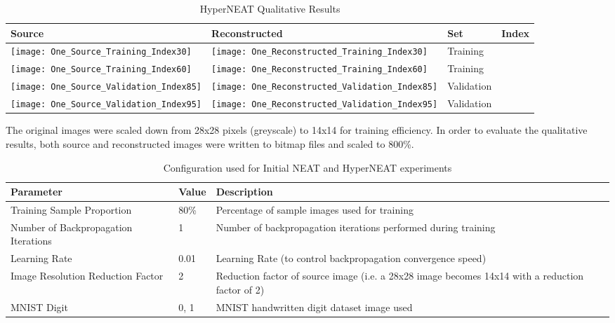 \documentclass{acm_proc_article-sp}
\begin{document}
\begin{table}[h]
	\caption{HyperNEAT Qualitative Results}
	\small
	\centering
	\begin{tabular}{>{\centering}m{1.7cm} >{\centering}m{2.1cm} >{\centering}m{1.7cm} >{\centering\arraybackslash}m{1.5cm}}
		\hline\hline
		\textbf{Source} & \textbf{Reconstructed} & \textbf{Set} & \textbf{Index} \\
		\hline
		\texttt{[image: One\_Source\_Training\_Index30]} & \texttt{[image: One\_Reconstructed\_Training\_Index30]} & Training & 30 \\
		\texttt{[image: One\_Source\_Training\_Index60]} & \texttt{[image: One\_Reconstructed\_Training\_Index60]} & Training & 60 \\
		\texttt{[image: One\_Source\_Validation\_Index85]} & \texttt{[image: One\_Reconstructed\_Validation\_Index85]} & Validation & 85 \\
		\texttt{[image: One\_Source\_Validation\_Index95]} & \texttt{[image: One\_Reconstructed\_Validation\_Index95]} & Validation & 95 \\
	\end{tabular}
	\label{table:imageresults}
\end{table}

The original images were scaled down from 28x28 pixels (greyscale) to 14x14 for training efficiency.  In order to evaluate the qualitative results, both source and reconstructed images were written to bitmap files and scaled to 800\%. 

\begin{table}[t]
	\caption{Configuration used for Initial NEAT and HyperNEAT experiments}
	\small
	\centering
	\begin{tabular}{|p{5cm}|p{0.8cm}|p{9cm}|}
		\hline\hline
		\textbf{Parameter} & \textbf{Value} & \textbf{Description} \\
		
		\hline
		
		Training Sample Proportion & 80\% & Percentage of sample images used for training \\
		\hline
		Number of Backpropagation Iterations & 1 & Number of backpropagation iterations performed during training \\
		\hline
		Learning Rate & 0.01 & Learning Rate (to control backpropagation convergence speed) \\
		\hline
		Image Resolution Reduction Factor & 2 & Reduction factor of source image (i.e. a 28x28 image becomes 14x14 with a reduction factor of 2) \\
		\hline
		MNIST Digit & 0, 1 & MNIST handwritten digit dataset image used \\
		
		\hline
	\end{tabular}
	\label{table:initialconfiguration}
\end{table}
\end{document}

